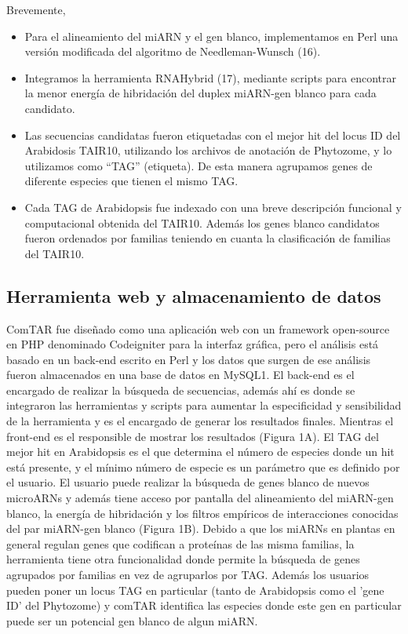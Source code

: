 Brevemente, 
\begin{itemize}
    \item Para el alineamiento del miARN y el gen blanco, implementamos en Perl una versión modificada del algoritmo de  Needleman-Wunsch (16).
    \item Integramos la herramienta RNAHybrid (17), mediante scripts para encontrar la menor energía de hibridación del duplex miARN-gen blanco para cada candidato.
    \item Las secuencias candidatas fueron etiquetadas con el mejor hit del locus ID del  Arabidosis TAIR10, utilizando los archivos de anotación de Phytozome, y lo utilizamos como “TAG” (etiqueta). De esta manera agrupamos genes de diferente especies que tienen el mismo TAG.
    \item Cada TAG de Arabidopsis fue indexado con una breve descripción funcional y computacional obtenida del TAIR10. Además los genes blanco candidatos fueron ordenados por familias teniendo en cuanta la clasificación de familias del TAIR10.
\end{itemize}

\subsection{Herramienta web y almacenamiento de datos}
	ComTAR fue diseñado como una aplicación web con un framework open-source en PHP denominado Codeigniter para la interfaz gráfica, pero el análisis está basado en un back-end escrito en Perl y los datos que surgen de ese análisis fueron almacenados en una base de datos en MySQL1. El back-end es el encargado de realizar la búsqueda de secuencias, además ahí es donde se integraron las herramientas y scripts para aumentar la especificidad y sensibilidad de la herramienta y es el encargado de generar los resultados finales. Mientras el front-end es el responsible de mostrar los resultados (Figura 1A). 
	El TAG del mejor hit en Arabidopsis es el que determina el número de especies donde un hit está presente, y el mínimo número de especie es un parámetro que es definido por el usuario. El usuario puede realizar la búsqueda de genes blanco de nuevos microARNs y además tiene acceso por pantalla del alineamiento del miARN-gen blanco, la energía de hibridación y los filtros empíricos de interacciones conocidas del par miARN-gen blanco (Figura 1B). Debido a que los miARNs en plantas en general regulan genes que codifican a proteínas de las misma familias, la herramienta tiene otra funcionalidad donde permite la búsqueda de genes agrupados por familias en vez de agruparlos por TAG. Además los usuarios pueden poner un locus TAG en particular (tanto de Arabidopsis como el 'gene ID' del Phytozome) y comTAR identifica las especies donde este gen en particular puede ser un potencial gen blanco de algun miARN.
 
